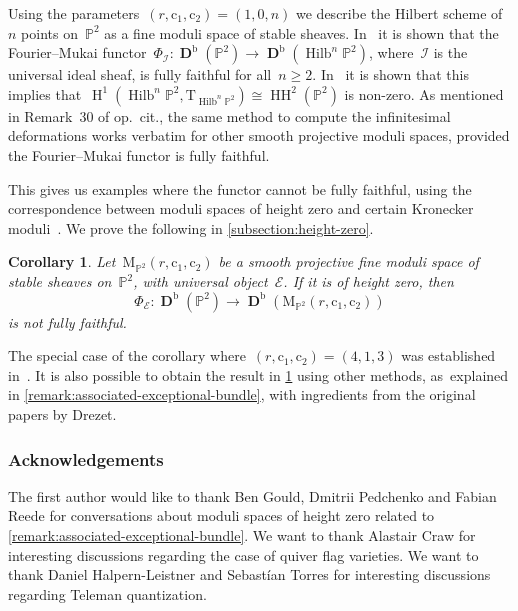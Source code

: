 \documentclass[11pt]{article}
\theoremstyle{plain}
\newtheorem{alphacorollary}[alphatheorem]{Corollary}
\theoremstyle{definition}
\DeclareMathOperator\derived{\mathbf{D}}
\DeclareMathOperator\HH{H}
\DeclareMathOperator\hochschild{HH}
\DeclareMathOperator\Hilb{Hilb}
\newcommand\bounded{\ensuremath{\mathrm{b}}}
\newcommand\moduli{\ensuremath{\mathrm{M}}}
\newcommand\tangent{\ensuremath{\mathrm{T}}}
\begin{document}
Using the parameters~$(r,\mathrm{c}_1,\mathrm{c}_2)=(1,0,n)$
we describe the Hilbert scheme of~$n$ points on~$\mathbb{P}^2$
as a fine moduli space of stable sheaves.
In~\cite[Th.\,1.2]{MR3397451} it is shown that the Fourier--Mukai functor~$\Phi_{\mathcal{I}}\colon\derived^\bounded(\mathbb{P}^2)\to\derived^\bounded(\Hilb^n\mathbb{P}^2)$,
where~$\mathcal{I}$ is the universal ideal sheaf,
is fully faithful for all~$n\geq 2$.
In~\cite[Prop.\,29]{MR3950704} it is shown that this implies that~$\HH^1(\Hilb^n\mathbb{P}^2,\tangent_{\Hilb^n\mathbb{P}^2})\cong\hochschild^2(\mathbb{P}^2)$ is non-zero.
As mentioned in Remark~30 of op.~cit.,
the same method to compute the infinitesimal deformations
works verbatim for other smooth projective moduli spaces,
provided the Fourier--Mukai functor is fully faithful.

This gives us examples where the functor cannot be fully faithful,
using the correspondence between moduli spaces of height zero
and certain Kronecker moduli~\cite[Th.\,2]{MR0916199}.
We prove the following in \cref{subsection:height-zero}.

\begin{alphacorollary}
\label{corollary:height-zero}
Let~$\moduli_{\mathbb{P}^2}(r,\mathrm{c}_1,\mathrm{c}_2)$ be a smooth projective
fine moduli space of stable sheaves on~$\mathbb{P}^2$,
with universal object~$\mathcal{E}$.
If it is of height zero,
then
\begin{equation}
\label{equation:height-zero-functor}
\Phi_{\mathcal{E}}\colon\derived^\bounded(\mathbb{P}^2)\to\derived^\bounded(\moduli_{\mathbb{P}^2}(r,\mathrm{c}_1,\mathrm{c}_2))
\end{equation}
is not fully faithful.
\end{alphacorollary}

The special case of the corollary where~$(r,\mathrm{c}_1,\mathrm{c}_2)=(4,1,3)$
was established in~\cite{MR4223526}.
It is also possible to obtain the result in \cref{corollary:height-zero} using other methods, as~explained in \cref{remark:associated-exceptional-bundle},
with ingredients from the original papers by Drezet.

\subsubsection*{Acknowledgements}

The first author would like to thank Ben Gould, Dmitrii Pedchenko and Fabian Reede
for conversations about moduli spaces of height zero
related to \cref{remark:associated-exceptional-bundle}.
We want to thank Alastair Craw for interesting discussions regarding the case of quiver flag varieties.
We want to thank Daniel Halpern-Leistner and Sebastían Torres for interesting discussions
regarding Teleman quantization.
\end{document}
